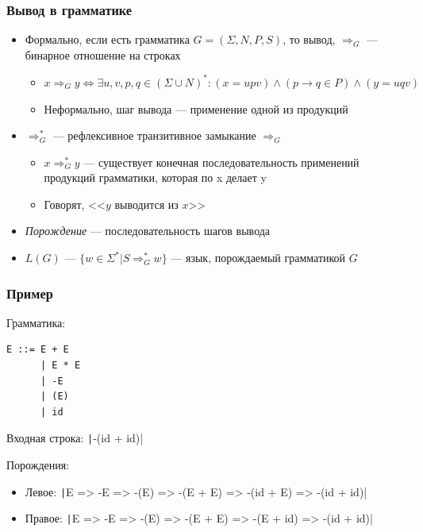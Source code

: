 \documentclass[xetex,mathserif,serif]{beamer}
\begin{document}
    \begin{frame}
        \frametitle{Вывод в грамматике}
        \begin{itemize}
            \item Формально, если есть грамматика $G = (\Sigma, N, P, S)$, то вывод, $\Rightarrow_G$ --- бинарное отношение на строках
            \begin{itemize}
                \item $x \Rightarrow_G y \iff \exists u, v, p, q \in (\Sigma \cup N)^*: (x = upv) \wedge (p \rightarrow q \in P) \wedge (y = uqv)$
                \item Неформально, шаг вывода --- применение одной из продукций
            \end{itemize}
            \item $\Rightarrow_G^*$ --- рефлексивное транзитивное замыкание $\Rightarrow_G$
            \begin{itemize}
                \item $x \Rightarrow_G^* y$ --- существует конечная последовательность применений продукций грамматики, которая по x делает y
                \item Говорят, <<$y$ выводится из $x$>>
            \end{itemize}
            \item \textit{Порождение} --- последовательность шагов вывода
            \item $L(G)$ --- $\{w \in \Sigma^* | S \Rightarrow_G^* w\}$ --- язык, порождаемый грамматикой $G$
        \end{itemize}
    \end{frame}

    \begin{frame}[fragile]
        \frametitle{Пример}
        Грамматика:
        \begin{verbatim}
E ::= E + E
      | E * E
      | -E
      | (E)
      | id
        \end{verbatim}
        
        Входная строка: \texttt|-(id + id)|
        
        Порождения:
        \begin{itemize}
            \item Левое: \texttt|E => -E => -(E) => -(E + E) => -(id + E) => -(id + id)|
            \item Правое: \texttt|E => -E => -(E) => -(E + E) => -(E + id) => -(id + id)|
        \end{itemize}
    \end{frame}
\end{document}

